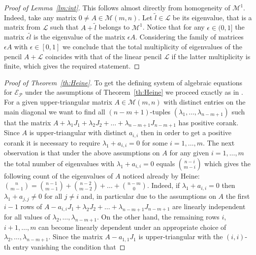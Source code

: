 \documentclass[10pt,twoside,a4paper,reqno]{amsart}
\theoremstyle{plain}
\theoremstyle{definition}
\theoremstyle{remark}
\begin{document}
\begin{proof}[Proof of Lemma~\ref{lm:int}]
This follows almost directly from homogeneity of ${\mathcal {M}}^1$. Indeed, take any matrix $0\neq A\in {\mathcal {M}}(m,n)$. Let $\tilde l \in {\mathcal L}$ be its eigenvalue, that is a matrix from ${\mathcal L}$ such that $A+\tilde l$ belongs to ${\mathcal {M}}^1$.  Notice that for any ${\epsilon}\in (0,1]$ the matrix ${\epsilon} \tilde l$ is the eigenvalue of the matrix ${\epsilon} A$. Considering the family of matrices ${\epsilon} A$ with ${\epsilon}\in [0,1]$ we conclude that the
total multiplicity of eigenvalues of the pencil $A+{\mathcal L}$ coincides with that of the linear pencil ${\mathcal L}$ if the latter multiplicity is finite, which gives the required statement.
\end{proof}

\begin{proof}[Proof of Theorem~\ref{th:Heine}]
To get the defining system of algebraic equations for ${\mathcal E}_{\mathcal P}$ under the assumptions of Theorem~\ref{th:Heine} we proceed exactly as in \cite{He}.  For a given
upper-triangular matrix $A\in {\mathcal {M}}(m,n)$ with distinct entries on the main diagonal  we want to find  all $(n-m+1)$-tuples $({\lambda}_1,\ldots,{\lambda}_{n-m+1})$ such that the matrix $A+{\lambda}_1J_1+{\lambda}_2J_2+\ldots+{\lambda}_{n-m+1}J_{n-m+1}$ has positive corank. Since $A$ is upper-triangular with distinct $a_{i,i}$ then in order to get  a positive corank it is necessary to require   ${\lambda}_1+a_{i,i}=0$  for some $i=1,\ldots,m$.  The next observation is that under the above assumptions on $A$ for any given $i=1,\ldots,m$ the total number  of  eigenvalues with ${\lambda}_1+a_{i,i}=0$ equals $\binom {n-i}{m-i}$ which gives the following  count of the eigenvalues of $A$ noticed already by Heine: $\binom{n}{m-1}=\binom{n-1}{m-1}+\binom{n-2}{m-2}+\ldots+\binom{n-m}{0}.$ Indeed, if ${\lambda}_1+a_{i,i}=0$ then ${\lambda}_1+a_{j,j}\neq 0$ for all $j\neq i$ and, in particular due to the assumptions on $A$ the first $i-1$ rows of $A-a_{i,i}J_1+{\lambda}_2J_2+\ldots+{\lambda}_{n-m+1}J_{n-m+1}$ are linearly independent for all  values of ${\lambda}_2,\ldots,{\lambda}_{n-m+1}$. On the other hand, the remaining rows $i$, $i+1,\ldots,m$ can become linearly dependent under an appropriate choice of ${\lambda}_2,\ldots,{\lambda}_{n-m+1}$. Since the matrix $A-a_{1,1}J_1$ is upper-triangular with the $(i,i)$-th entry vanishing the condition that

\end{proof}
\end{document}
